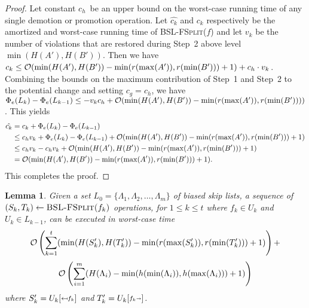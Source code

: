 \documentclass[11pt]{article}
\newcommand{\Bslfsplx}[1]{\mbox{\textsc{BSL-FSplit(\ensuremath{#1})}}}
\newcommand{\cons}[1]{\ensuremath{c_{#1}}}
\newcommand{\cnsg}{\cons g}
\newcommand{\cnsh}{\cons h}
\newcommand{\nodeheight}[1]{\ensuremath{h(#1)}}
\newcommand{\intheight}[1]{\ensuremath{H(#1)}}
\newcommand{\intmax}[1]{\ensuremath{\max(\intl #1)}}
\newcommand{\intmin}[1]{\ensuremath{\min(\intl #1)}}
\newcommand{\intl}[1]{\ensuremath{#1}}
\newcommand{\beforeop}[1]{\ensuremath{#1'}}
\newcommand{\noderank}[1]{\ensuremath{r(\node #1)}}
\newcommand{\node}[1]{\ensuremath{#1}}
\newcommand{\set}[1]{\ensuremath{#1}}
\newcommand{\prebsltempl}[4]{\ensuremath{#1{[\raisebox{#4}{$#3\mapsfrom\hspace{-0.0mm}#2$}]}}}
\newcommand{\prebsl}[2]{\ensuremath{\prebsltempl{#1}{#2}{\scriptstyle}{0.3mm}}}
\newcommand{\postbsltempl}[4]{\ensuremath{#1{[\raisebox{#4}{$#3#2\shortrightarrow\hspace{-0.0mm}$}]}}}
\newcommand{\postbsl}[2]{\ensuremath{\postbsltempl{#1}{#2}{\scriptstyle}{0.3mm}}}
\newcommand{\indatast}[1]{\ensuremath{L_{#1}}}
\newcommand{\locpotfun}[1]{\ensuremath{\Phi_{e}(#1)}}
\newcommand{\vionum}[1]{\ensuremath{v_{#1}}}
\newcommand{\amcost}[1]{\ensuremath{\hat{c_{#1}}}}
\newcommand{\actcost}[1]{\ensuremath{c_{#1}}}
\newcommand{\initbsl}[1]{\ensuremath{\Lambda_{#1}}}
\newcounter{count}
\newtheorem{lemma}[count]{Lemma}
\begin{document}
\begin{proof}
Let constant \cnsh\ be an upper bound on the worst-case running time of any single demotion or promotion operation. Let \amcost k and \actcost k respectively be the amortized and worst-case running time of \Bslfsplx{f} and let \vionum k be the number of violations that are restored during Step~2 above level $\min(\intheight{\beforeop{A}},\intheight{\beforeop{B}})$. 
Then we have $\actcost k \leq {\cal O}(\min(\intheight{\beforeop{A}},\intheight{\beforeop{B}}) - \min(\noderank{\intmax{\beforeop{A}}}, \noderank{\intmin{\beforeop{B}}})+1) + \cnsh\cdot \vionum k$. 
Combining the bounds on the maximum contribution of Step~1 and Step~2 to the potential change and setting $\cnsg = \cnsh$, we have $\locpotfun{\indatast k} - \locpotfun{\indatast{k-1}} \leq -\vionum k \cnsh + {\cal O}(\min(\intheight{\beforeop{A}},\intheight{\beforeop{B}}) - \min(\noderank{\intmax{\beforeop{A}}}, \noderank{\intmin{\beforeop{B}}}))$. 
This yields 
\begin{align*} 
\amcost{k} &= \actcost k + \locpotfun{\indatast k} - \locpotfun{\indatast{k-1}}\\ 
&\leq \cnsh\vionum k + \locpotfun{\indatast k} - \locpotfun{\indatast{k-1}}+ {\cal O}(\min(\intheight{\beforeop{A}},\intheight{\beforeop{B}}) - \min(\noderank{\intmax{\beforeop{A}}}, \noderank{\intmin{\beforeop{B}}})+1)\\ 
&\leq \cnsh\vionum k - \cnsh\vionum k +  {\cal O}(\min(\intheight{\beforeop{A}},\intheight{\beforeop{B}}) - \min(\noderank{\intmax{\beforeop{A}}}, \noderank{\intmin{\beforeop{B}}})+1) \\ 
&= {\cal O}(\min(\intheight{\beforeop{A}},\intheight{\beforeop{B}}) - \min(\noderank{\intmax{\beforeop{A}}}, \noderank{\intmin{\beforeop{B}}})+1). 
\end{align*} 
This completes the proof. 
\end{proof} 



\begin{lemma} 
\label{lem:wccostofbslfsplit} 
Given a set $\indatast 0=\{\initbsl 1, \initbsl 2,\ldots, \initbsl m\}$ of biased skip lists, a sequence of $(S_k, T_k) \leftarrow \Bslfsplx{f_k}$ operations, for $1\leq k \leq t$ where $f_k\in \set U_k$  and $\set U_k \in \indatast{k-1}$, can be executed in worst-case time 
\[ 
\mathcal O\left(\sum_{k=1}^t (\min(\intheight{\beforeop{S_k}},\intheight{\beforeop{T_k}}) - \min(\noderank{\intmax{\beforeop{S_k}}},\noderank{\intmin{\beforeop{T_k}}})+1)\right)+
\] 
\[\mathcal O\left(\sum_{i=1}^{m}(\intheight{\initbsl i} - \min(\nodeheight{\intmin{\initbsl i}},\nodeheight{\intmax{\initbsl i}})+1)\right) 
\] 
where $\beforeop{S_k} = \prebsl{{U_k}}{f_k}$ and $\beforeop{T_k}=\postbsl{{U_k}}{f_k}$. 
\end{lemma} 
\end{document}

